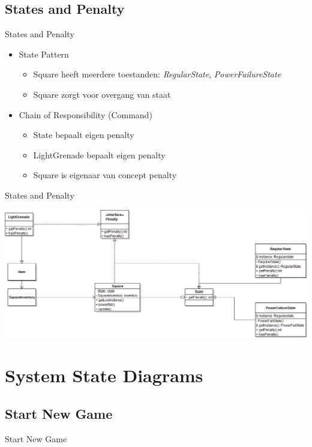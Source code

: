 \documentclass[t]{beamer}
\begin{document}
\subsection{States and Penalty}

\begin{frame}{States and Penalty}
\begin{itemize}
	\item State Pattern
	\begin{itemize}
		\item Square heeft meerdere toestanden: \textit{RegularState}, \textit{PowerFailureState}
		\item Square zorgt voor overgang van staat
	\end{itemize}
	\item Chain of Responsibility (Command)
	\begin{itemize}
		\item State bepaalt eigen penalty
		\item LightGrenade bepaalt eigen penalty
		\item Square is eigenaar van concept penalty
	\end{itemize}
\end{itemize}
\end{frame}

\begin{frame}{States and Penalty}
\begin{center}
\includegraphics[width=0.90\linewidth]{images/classDiagramStateAndPanelty}
\end{center}
\end{frame}



\section{System State Diagrams}
\subsection{Start New Game}
\begin{frame}{Start New Game}
\begin{center}
\end{center}
\end{frame}
\end{document}
